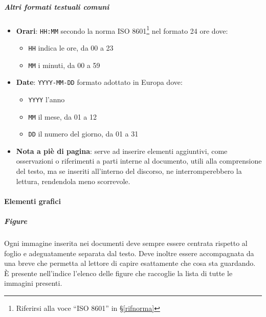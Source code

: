 			\subparagraph{Altri formati testuali comuni} \label{PS:Documentazione:Design:NormeT:AltriFormati}
			\begin{itemize}
				\item \textbf{Orari}: \texttt{HH:MM} secondo la norma ISO 8601\footnote{Riferirsi alla voce ``ISO 8601'' in \S\ref{rifnorma}}
				nel formato 24 ore dove:
				\begin{itemize}
					\item \texttt{HH} indica le ore, da 00 a 23
					\item \texttt{MM} i minuti, da 00 a 59
				\end{itemize}
				\item \textbf{Date}: \texttt{YYYY-MM-DD} formato adottato in Europa dove:
				\begin{itemize}
					\item \texttt{YYYY} l'anno
					\item \texttt{MM} il mese, da 01 a 12
					\item \texttt{DD} il numero del giorno, da 01 a 31
				\end{itemize}
				\item \textbf{Nota a piè di pagina}: serve ad inserire elementi aggiuntivi, come osservazioni o riferimenti a parti interne al documento, utili alla comprensione del testo,
				ma se inseriti all'interno del discorso, ne interromperebbero la lettura, rendendola meno scorrevole.
			\end{itemize}


			\paragraph{Elementi grafici}

			\subparagraph{Figure}
			Ogni immagine inserita nei documenti deve sempre essere centrata rispetto al foglio e adeguatamente separata dal testo. Deve inoltre essere
			accompagnata da una breve  che permetta al lettore di capire esattamente che cosa sta guardando.\\
			È presente nell'indice l'elenco delle figure che raccoglie la lista di tutte le immagini presenti.

